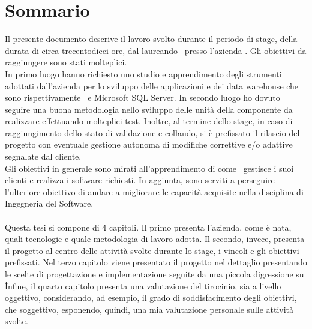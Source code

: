 
\cleardoublepage
{}
{}
\begingroup
\let\clearpage\relax
\let\cleardoublepage\relax
\let\cleardoublepage\relax

\chapter*{Sommario}

Il presente documento descrive il lavoro svolto durante il periodo di stage, della durata di circa trecentodieci ore, dal laureando \myName\ presso l'azienda \azienda .
Gli obiettivi da raggiungere sono stati molteplici.\\
In primo luogo hanno richiesto uno studio e apprendimento degli strumenti adottati dall'azienda per lo sviluppo delle applicazioni e dei data warehouse che sono rispettivamente \inde\ e  Microsoft SQL Server. In secondo luogo ho dovuto seguire una buona metodologia nello sviluppo delle unità della componente da realizzare effettuando molteplici test. Inoltre, al termine dello stage, in caso di raggiungimento dello stato di validazione e collaudo, si è prefissato il rilascio del progetto con eventuale gestione autonoma di modifiche correttive e/o adattive segnalate dal cliente.\\
Gli obiettivi in generale sono mirati all'apprendimento di come \azienda\ gestisce i suoi clienti e realizza i software richiesti. In aggiunta, sono serviti a perseguire l'ulteriore obiettivo di andare a migliorare le capacità acquisite nella disciplina di Ingegneria del Software.\\
\\
Questa tesi si compone di 4 capitoli. 
Il primo presenta l'azienda, come è nata, quali tecnologie e quale metodologia di lavoro adotta. Il secondo, invece, presenta il progetto al centro delle attività svolte durante lo stage, i vincoli e gli obiettivi prefissati. Nel terzo capitolo viene presentato il progetto nel dettaglio presentando le scelte di progettazione e implementazione seguite da una piccola digressione su \inde\.
Infine, il quarto capitolo presenta una valutazione del tirocinio, sia a livello oggettivo, considerando, ad esempio, il grado di soddisfacimento degli obiettivi, che soggettivo, esponendo, quindi, una mia valutazione personale sulle attività svolte.


%
%

\endgroup			

\vfill

